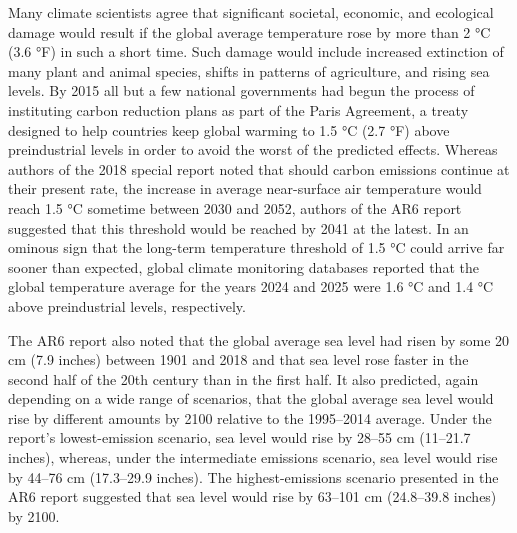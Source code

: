 Many climate scientists agree that significant societal, economic, and ecological damage would result if the global average temperature rose by more than 2 °C (3.6 °F) in such a short time. Such damage would include increased extinction of many plant and animal species, shifts in patterns of agriculture, and rising sea levels. By 2015 all but a few national governments had begun the process of instituting carbon reduction plans as part of the Paris Agreement, a treaty designed to help countries keep global warming to 1.5 °C (2.7 °F) above preindustrial levels in order to avoid the worst of the predicted effects. Whereas authors of the 2018 special report noted that should carbon emissions continue at their present rate, the increase in average near-surface air temperature would reach 1.5 °C sometime between 2030 and 2052, authors of the AR6 report suggested that this threshold would be reached by 2041 at the latest. In an ominous sign that the long-term temperature threshold of 1.5 °C could arrive far sooner than expected, global climate monitoring databases reported that the global temperature average for the years 2024 and 2025 were 1.6 °C and 1.4 °C above preindustrial levels, respectively.


The AR6 report also noted that the global average sea level had risen by some 20 cm (7.9 inches) between 1901 and 2018 and that sea level rose faster in the second half of the 20th century than in the first half. It also predicted, again depending on a wide range of scenarios, that the global average sea level would rise by different amounts by 2100 relative to the 1995–2014 average. Under the report’s lowest-emission scenario, sea level would rise by 28–55 cm (11–21.7 inches), whereas, under the intermediate emissions scenario, sea level would rise by 44–76 cm (17.3–29.9 inches). The highest-emissions scenario presented in the AR6 report suggested that sea level would rise by 63–101 cm (24.8–39.8 inches) by 2100.

